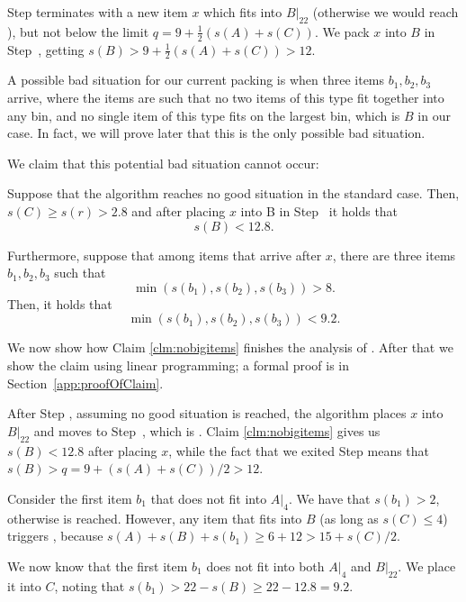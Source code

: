Step  terminates with a new item $x$ which fits into %
$B|_{22}$ (otherwise we would reach ),
but not below the limit $q = 9 + \frac{1}{2}(s(A)+s(C))$. We pack $x$
into $B$ in Step~, getting $s(B) > 9 + \frac{1}{2}(s(A)+s(C)) > 12$.

A possible bad situation for our current packing is when three items $b_1,
b_2, b_3$ arrive, where the items are such that no two items
of this type fit together into any bin, and no single item of this
type fits on the largest bin, which is $B$ in our case. In fact, we
will prove later that this is the only possible bad situation.

We claim that this potential bad situation cannot
occur:

\begin{clm}\label{clm:nobigitems}
Suppose that the algorithm \tbalg reaches no good situation in the standard case. Then,
$s(C)\ge s(r)>2.8$ and after placing $x$ into B in Step~{\rm {}} it holds that
\[s(B)<12.8.\]

Furthermore, suppose that among items that arrive after $x$, there are three items $b_1, b_2, b_3$ such that 
\[\min( s(b_1), s(b_2), s(b_3)) > 8.\] Then, it holds that 
\[\min(s(b_1),s(b_2),s(b_3)) < 9.2. \]

\end{clm}

We now show how Claim \ref{clm:nobigitems} finishes the analysis of \tbalg.
After that we show the claim using linear programming; a formal proof is in
Section~\ref{app:proofOfClaim}.

After Step , assuming no good situation is reached, the
algorithm places $x$ into $B|_{22}$ and moves to Step~,
which is . Claim \ref{clm:nobigitems}
gives us $s(B) < 12.8$ after placing $x$, while the fact that we exited
Step  means that $s(B) > q = 9 + \left( s(A)+s(C) \right)/2 > 12$.

Consider the first item $b_1$ that does not fit into $A|_4$. We have
that $s(b_1)>2$, otherwise  is
reached. However, any item that fits into $B$ (as long as $s(C) \le 4$) triggers
, because $s(A) + s(B) + s(b_1) \ge  6 + 12 > 15 + s(C)/2$.

We now know that the first item $b_1$ does not fit into both $A|_{4}$ and $B|_{22}$.
We place it into $C$, noting that $s(b_1) > 22 - s(B) \ge  22 - 12.8 = 9.2$.

